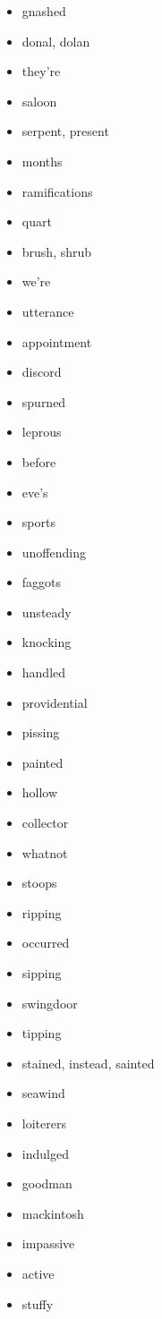 \documentclass{article}
\begin{document}
\begin{itemize}
    \item gnashed
    \item donal, dolan
    \item they're
    \item saloon
    \item serpent, present
    \item months
    \item ramifications
    \item quart
    \item brush, shrub
    \item we're
    \item utterance
    \item appointment
    \item discord
    \item spurned
    \item leprous
    \item before
    \item eve's
    \item sports
    \item unoffending
    \item faggots
    \item unsteady
    \item knocking
    \item handled
    \item providential
    \item pissing
    \item painted
    \item hollow
    \item collector
    \item whatnot
    \item stoops
    \item ripping
    \item occurred
    \item sipping
    \item swingdoor
    \item tipping
    \item stained, instead, sainted
    \item seawind
    \item loiterers
    \item indulged
    \item goodman
    \item mackintosh
    \item impassive
    \item active
    \item stuffy

\end{itemize}
\end{document}
